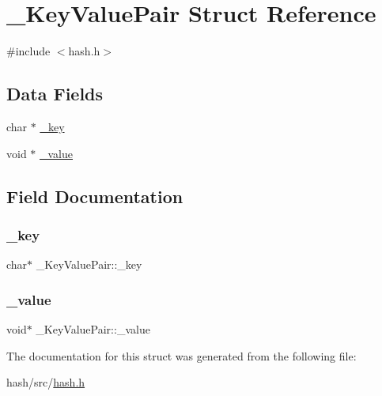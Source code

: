 \hypertarget{struct__KeyValuePair}{}\section{\+\_\+\+Key\+Value\+Pair Struct Reference}
\label{struct__KeyValuePair}


{\ttfamily \#include $<$hash.\+h$>$}

\subsection*{Data Fields}
\begin{DoxyCompactItemize}
\item 
char $\ast$ \mbox{\hyperlink{struct__KeyValuePair_a50d41beb7885ba3c1cf2f3c063395adb}{\+\_\+key}}
\item 
void $\ast$ \mbox{\hyperlink{struct__KeyValuePair_a304cf7fa6300fbabe54276e0790bc3c0}{\+\_\+value}}
\end{DoxyCompactItemize}


\subsection{Field Documentation}
\mbox{\label{struct__KeyValuePair_a50d41beb7885ba3c1cf2f3c063395adb}} 
\subsubsection{\texorpdfstring{\+\_\+key}{\_key}}
{\footnotesize\ttfamily char$\ast$ \+\_\+\+Key\+Value\+Pair\+::\+\_\+key}

\mbox{\label{struct__KeyValuePair_a304cf7fa6300fbabe54276e0790bc3c0}} 
\subsubsection{\texorpdfstring{\+\_\+value}{\_value}}
{\footnotesize\ttfamily void$\ast$ \+\_\+\+Key\+Value\+Pair\+::\+\_\+value}



The documentation for this struct was generated from the following file\+:\begin{DoxyCompactItemize}
\item 
hash/src/\mbox{\hyperlink{hash_8h}{hash.\+h}}\end{DoxyCompactItemize}
